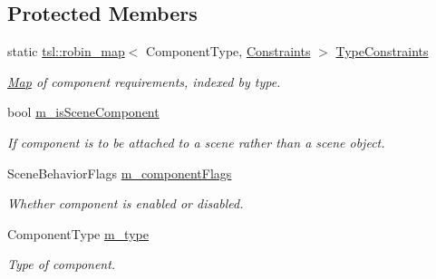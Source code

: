 \subsection*{Protected Members}
\begin{DoxyCompactItemize}
\item 
static \mbox{\hyperlink{classtsl_1_1robin__map}{tsl\+::robin\+\_\+map}}$<$ Component\+Type, \mbox{\hyperlink{structrev_1_1_component_1_1_constraints}{Constraints}} $>$ \mbox{\hyperlink{classrev_1_1_component_ace286070097cd9f3e3594105613c36a3}{Type\+Constraints}}
\begin{DoxyCompactList}\small\item\em \mbox{\hyperlink{classrev_1_1_map}{Map}} of component requirements, indexed by type. \end{DoxyCompactList}\item 
\mbox{\label{classrev_1_1_component_a9ec46d7b5f9342526e42f8b894a2ec0d}} 
bool \mbox{\hyperlink{classrev_1_1_component_a9ec46d7b5f9342526e42f8b894a2ec0d}{m\+\_\+is\+Scene\+Component}}
\begin{DoxyCompactList}\small\item\em If component is to be attached to a scene rather than a scene object. \end{DoxyCompactList}\item 
\mbox{\label{classrev_1_1_component_a4b5b5705ce452e42871e8e11436963d0}} 
Scene\+Behavior\+Flags \mbox{\hyperlink{classrev_1_1_component_a4b5b5705ce452e42871e8e11436963d0}{m\+\_\+component\+Flags}}
\begin{DoxyCompactList}\small\item\em Whether component is enabled or disabled. \end{DoxyCompactList}\item 
\mbox{\label{classrev_1_1_component_a3adf9282b15dc15ba1bdd5f323808151}} 
Component\+Type \mbox{\hyperlink{classrev_1_1_component_a3adf9282b15dc15ba1bdd5f323808151}{m\+\_\+type}}
\begin{DoxyCompactList}\small\item\em Type of component. \end{DoxyCompactList}\item 
\mbox{\label{classrev_1_1_component_a1fc184df2274ac24e8f0c2eff011f492}} 

\end{DoxyCompactItemize}
